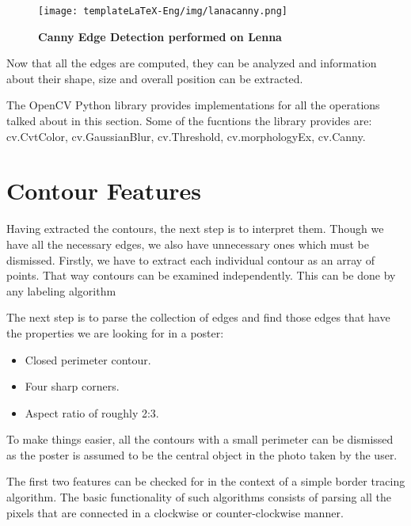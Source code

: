 \documentclass[12pt,a4paper,twoside]{report}
\begin{document}
\begin{figure}[H]
    \begin{center}
        \texttt{[image: templateLaTeX-Eng/img/lanacanny.png]}
        \caption{\bf Canny Edge Detection performed on Lenna}
    \end{center}
\end{figure}

Now that all the edges are computed, they can be analyzed and information about their shape, size and overall position can be extracted.

The OpenCV Python library provides implementations for all the operations talked about in this section. Some of the fucntions the library provides are: cv.CvtColor, cv.GaussianBlur, cv.Threshold, cv.morphologyEx, cv.Canny.


\newpage
\section{Contour Features}
Having extracted the contours, the next step is to interpret them. Though we have all the necessary edges, we also have unnecessary ones which must be dismissed. Firstly, we have to extract each individual contour as an array of points. That way contours can be examined independently. This can be done by any labeling algorithm

The next step is to parse the collection of edges and find those edges that have the properties we are looking for in a poster:
\begin{itemize}
    \item Closed perimeter contour.
    \item Four sharp corners.
    \item Aspect ratio of roughly 2:3.
\end{itemize}

To make things easier, all the contours with a small perimeter can be dismissed as the poster is assumed to be the central object in the photo taken by the user.

The first two features can be checked for in the context of a simple border tracing algorithm. The basic functionality of such algorithms consists of parsing all the pixels that are connected in a clockwise or counter-clockwise manner.
\end{document}
